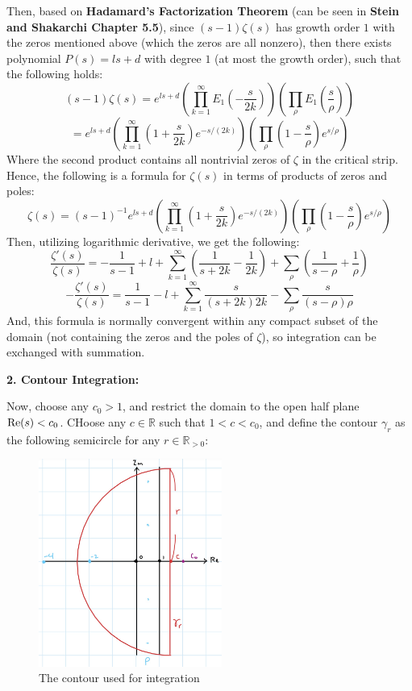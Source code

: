 \documentclass{article}
\begin{document}
Then, based on \textbf{Hadamard's Factorization Theorem} (can be seen in \textbf{Stein and Shakarchi Chapter 5.5}), since $(s-1)\zeta(s)$ has growth order $1$ with the zeros mentioned above (which the zeros are all nonzero), then there exists polynomial $P(s) = ls+d$ with degree $1$ (at most the growth order), such that the following holds:
$$(s-1)\zeta(s)=e^{ls+d}\left(\prod_{k=1}^{\infty}E_1\left(-\frac{s}{2k}\right)\right)\left(\prod_{\rho}E_1\left(\frac{s}{\rho}\right)\right)$$
$$ = e^{ls+d}\left(\prod_{k=1}^{\infty}\left(1+\frac{s}{2k}\right)e^{-s/(2k)}\right)\left(\prod_{\rho}\left(1-\frac{s}{\rho}\right)e^{s/\rho}\right)$$
Where the second product contains all nontrivial zeros of $\zeta$ in the critical strip. Hence, the following is a formula for $\zeta(s)$ in terms of products of zeros and poles:
$$\zeta(s) = (s-1)^{-1}e^{ls+d}\left(\prod_{k=1}^{\infty}\left(1+\frac{s}{2k}\right)e^{-s/(2k)}\right)\left(\prod_{\rho}\left(1-\frac{s}{\rho}\right)e^{s/\rho}\right)$$
Then, utilizing logarithmic derivative, we get the following:
$$\frac{\zeta'(s)}{\zeta(s)} = -\frac{1}{s-1}+l+\sum_{k=1}^{\infty}\left(\frac{1}{s+2k}-\frac{1}{2k}\right) + \sum_{\rho}\left(\frac{1}{s-\rho}+\frac{1}{\rho}\right)$$
$$-\frac{\zeta'(s)}{\zeta(s)}=\frac{1}{s-1}-l+\sum_{k=1}^{\infty}\frac{s}{(s+2k)2k}-\sum_{\rho}\frac{s}{(s-\rho)\rho}$$
And, this formula is normally convergent within any compact subset of the domain (not containing the zeros and the poles of $\zeta$), so integration can be exchanged with summation.

\hfil

\textbf{2. Contour Integration:}

Now, choose any $c_0>1$, and restrict the domain to the open half plane $\textmd{Re}(s)<c_0$. CHoose any $c\in\mathbb{R}$ such that $1<c<c_0$, and define the contour $\gamma_{r}$ as the following semicircle for any $r\in\mathbb{R}_{>0}$:

\begin{figure}[h!]
    \begin{center}
        \includegraphics*[width=60mm]{contour2.jpg}
        \caption{The contour used for integration}
    \end{center}
\end{figure}
\end{document}
